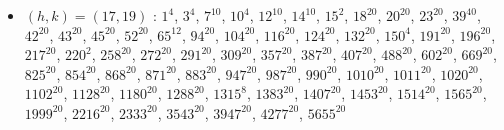 \begin{itemize}
\item $(h,k)=(17,19)$ : $1^{4}$, $3^{4}$, $7^{10}$, $10^{4}$, $12^{10}$, $14^{10}$, $15^{2}$, $18^{20}$, $20^{20}$, $23^{20}$, $39^{40}$, $42^{20}$, $43^{20}$, $45^{20}$, $52^{20}$, $65^{12}$, $94^{20}$, $104^{20}$, $116^{20}$, $124^{20}$, $132^{20}$, $150^{4}$, $191^{20}$, $196^{20}$, $217^{20}$, $220^{2}$, $258^{20}$, $272^{20}$, $291^{20}$, $309^{20}$, $357^{20}$, $387^{20}$, $407^{20}$, $488^{20}$, $602^{20}$, $669^{20}$, $825^{20}$, $854^{20}$, $868^{20}$, $871^{20}$, $883^{20}$, $947^{20}$, $987^{20}$, $990^{20}$, $1010^{20}$, $1011^{20}$, $1020^{20}$, $1102^{20}$, $1128^{20}$, $1180^{20}$, $1288^{20}$, $1315^{8}$, $1383^{20}$, $1407^{20}$, $1453^{20}$, $1514^{20}$, $1565^{20}$, $1999^{20}$, $2216^{20}$, $2333^{20}$, $3543^{20}$, $3947^{20}$, $4277^{20}$, $5655^{20}$
\end{itemize}
